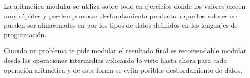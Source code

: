 La aritmética modular se utiliza sobre todo en ejercicios donde los valores crecen muy rápidos y pueden provocar desbordamiento producto a que los valores no pueden ser almacenados en por los tipos de datos definidos en los lenguajes de programación.

Cuando un problema te pide modular el resultado final es recomendable modular desde las operaciones intermedias aplicando lo visto hasta ahora para cada operación aritmética y de esta forma se evita posibles desbordamiento de datos.  
